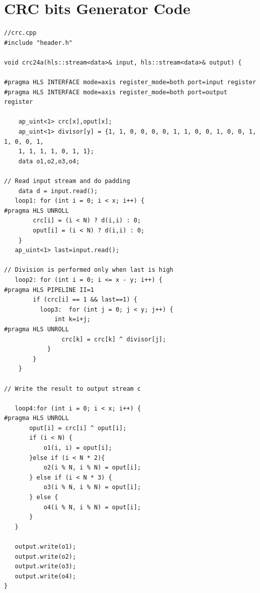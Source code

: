 \documentclass{article}
\begin{document}
\section{CRC bits Generator Code}
\begin{lstlisting}
//crc.cpp
#include "header.h"

void crc24a(hls::stream<data>& input, hls::stream<data>& output) {

#pragma HLS INTERFACE mode=axis register_mode=both port=input register
#pragma HLS INTERFACE mode=axis register_mode=both port=output register

	ap_uint<1> crc[x],oput[x];
    ap_uint<1> divisor[y] = {1, 1, 0, 0, 0, 0, 1, 1, 0, 0, 1, 0, 0, 1, 1, 0, 0, 1,
    1, 1, 1, 1, 0, 1, 1};
    data o1,o2,o3,o4;

// Read input stream and do padding
    data d = input.read();
   loop1: for (int i = 0; i < x; i++) {
#pragma HLS UNROLL
    	crc[i] = (i < N) ? d(i,i) : 0;
    	oput[i] = (i < N) ? d(i,i) : 0;
    }
   ap_uint<1> last=input.read();

// Division is performed only when last is high
   loop2: for (int i = 0; i <= x - y; i++) {
#pragma HLS PIPELINE II=1
        if (crc[i] == 1 && last==1) {
          loop3:  for (int j = 0; j < y; j++) {
        	  int k=i+j;
#pragma HLS UNROLL
                crc[k] = crc[k] ^ divisor[j];
            }
        }
    }

// Write the result to output stream c

   loop4:for (int i = 0; i < x; i++) {
#pragma HLS UNROLL
	   oput[i] = crc[i] ^ oput[i];
       if (i < N) {
           o1(i, i) = oput[i];
       }else if (i < N * 2){
           o2(i % N, i % N) = oput[i];
       } else if (i < N * 3) {
           o3(i % N, i % N) = oput[i];
       } else {
           o4(i % N, i % N) = oput[i];
       }
   }

   output.write(o1);
   output.write(o2);
   output.write(o3);
   output.write(o4);
}

\end{lstlisting}
\vspace{2cm}
\end{document}

